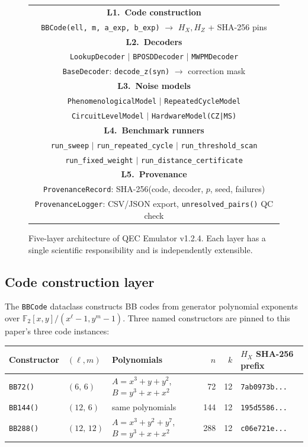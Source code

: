\documentclass[11pt,a4paper]{article}
\begin{document}
\begin{figure}[H]
\centering
\begin{tabular}{|c|}
\hline
\textbf{L1.\ Code construction} \\
\texttt{BBCode(ell, m, a\_exp, b\_exp)} $\to$ $H_X, H_Z$ + SHA-256 pins \\
\hline
\textbf{L2.\ Decoders} \\
\texttt{LookupDecoder} $\mid$ \texttt{BPOSDDecoder} $\mid$ \texttt{MWPMDecoder} \\
\texttt{BaseDecoder}: \texttt{decode\_z(syn)} $\to$ correction mask \\
\hline
\textbf{L3.\ Noise models} \\
\texttt{PhenomenologicalModel} $\mid$ \texttt{RepeatedCycleModel} \\
\texttt{CircuitLevelModel} $\mid$ \texttt{HardwareModel(CZ|MS)} \\
\hline
\textbf{L4.\ Benchmark runners} \\
\texttt{run\_sweep} $\mid$ \texttt{run\_repeated\_cycle} $\mid$ \texttt{run\_threshold\_scan} \\
\texttt{run\_fixed\_weight} $\mid$ \texttt{run\_distance\_certificate} \\
\hline
\textbf{L5.\ Provenance} \\
\texttt{ProvenanceRecord}: SHA-256(code, decoder, $p$, seed, failures) \\
\texttt{ProvenanceLogger}: CSV/JSON export, \texttt{unresolved\_pairs()} QC check \\
\hline
\end{tabular}
\caption{Five-layer architecture of QEC Emulator v1.2.4.
  Each layer has a single scientific responsibility and is independently
  extensible.}
\label{fig:emulator-arch}
\end{figure}

\subsection{Code construction layer}

The \texttt{BBCode} dataclass constructs BB codes from generator polynomial
exponents over $\mathbb{F}_2[x,y]/(x^\ell-1,y^m-1)$.
Three named constructors are pinned to this paper's three code instances:

\begin{center}
\small
\begin{tabular}{@{}lllrrl@{}}
\toprule
Constructor & $(\ell,m)$ & Polynomials & $n$ & $k$ & $H_X$ SHA-256 prefix \\
\midrule
\texttt{BB72()}  & $(6,\,6)$   & $A=x^3+y+y^2$, $B=y^3+x+x^2$ & 72  & 12 & \texttt{7ab0973b...} \\
\texttt{BB144()} & $(12,\,6)$  & same polynomials              & 144 & 12 & \texttt{195d5586...} \\
\texttt{BB288()} & $(12,\,12)$ & $A=x^3+y^2+y^7$, $B=y^3+x+x^2$ & 288 & 12 & \texttt{c06e721e...} \\
\bottomrule
\end{tabular}
\end{center}
\end{document}
